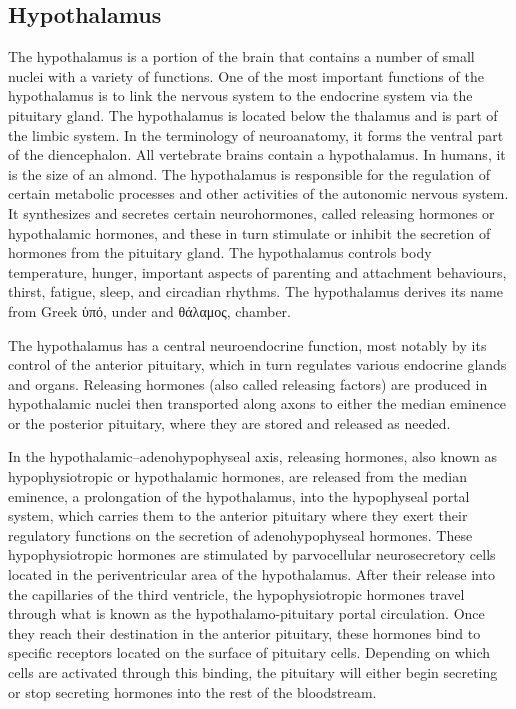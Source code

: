\documentclass[]{book}
\begin{document}
\hypertarget{hypothalamus}{%
\subsection{Hypothalamus}\label{hypothalamus}}

The hypothalamus is a portion of the brain that contains a number of small nuclei with a variety of functions. One of the most important functions of the hypothalamus is to link the nervous system to the endocrine system via the pituitary gland. The hypothalamus is located below the thalamus and is part of the limbic system. In the terminology of neuroanatomy, it forms the ventral part of the diencephalon. All vertebrate brains contain a hypothalamus. In humans, it is the size of an almond. The hypothalamus is responsible for the regulation of certain metabolic processes and other activities of the autonomic nervous system. It synthesizes and secretes certain neurohormones, called releasing hormones or hypothalamic hormones, and these in turn stimulate or inhibit the secretion of hormones from the pituitary gland. The hypothalamus controls body temperature, hunger, important aspects of parenting and attachment behaviours, thirst, fatigue, sleep, and circadian rhythms. The hypothalamus derives its name from Greek ὑπό, under and θάλαμος, chamber.

The hypothalamus has a central neuroendocrine function, most notably by its control of the anterior pituitary, which in turn regulates various endocrine glands and organs. Releasing hormones (also called releasing factors) are produced in hypothalamic nuclei then transported along axons to either the median eminence or the posterior pituitary, where they are stored and released as needed.

In the hypothalamic--adenohypophyseal axis, releasing hormones, also known as hypophysiotropic or hypothalamic hormones, are released from the median eminence, a prolongation of the hypothalamus, into the hypophyseal portal system, which carries them to the anterior pituitary where they exert their regulatory functions on the secretion of adenohypophyseal hormones. These hypophysiotropic hormones are stimulated by parvocellular neurosecretory cells located in the periventricular area of the hypothalamus. After their release into the capillaries of the third ventricle, the hypophysiotropic hormones travel through what is known as the hypothalamo-pituitary portal circulation. Once they reach their destination in the anterior pituitary, these hormones bind to specific receptors located on the surface of pituitary cells. Depending on which cells are activated through this binding, the pituitary will either begin secreting or stop secreting hormones into the rest of the bloodstream.
\end{document}
